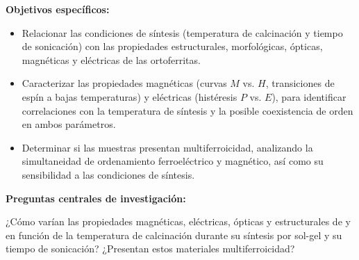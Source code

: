 \documentclass[../main.tex]{subfiles}
\begin{document}
\textbf{Objetivos específicos:}
\begin{itemize}
    \item Relacionar las condiciones de síntesis (temperatura de calcinación y tiempo de sonicación) con las propiedades estructurales, morfológicas, ópticas, magnéticas y eléctricas de las ortoferritas.
    \item Caracterizar las propiedades magnéticas (curvas $M$ vs. $H$, transiciones de espín a bajas temperaturas) y eléctricas (histéresis $P$ vs. $E$), para identificar correlaciones con la temperatura de síntesis y la posible coexistencia de orden en ambos parámetros.
    \item Determinar si las muestras presentan multiferroicidad, analizando la simultaneidad de ordenamiento ferroeléctrico y magnético, así como su sensibilidad a las condiciones de síntesis.
\end{itemize}
\textbf{Preguntas centrales de investigación:}

¿Cómo varían las propiedades magnéticas, eléctricas, ópticas y estructurales de \neod{} y \sama{} en función de la temperatura de calcinación durante su síntesis por sol-gel y su tiempo de sonicación? ¿Presentan estos materiales multiferroicidad?
\end{document}
